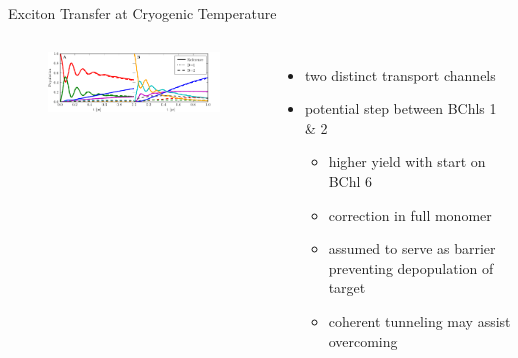 \documentclass{beamer}
\begin{document}
\begin{frame}[label=cryogenic2]{Exciton Transfer at Cryogenic Temperature}
\begin{center}
\begin{columns}
      \begin{figure}[t]
        \centering
        \includegraphics[width=250pt]{fmo_ishfl.pdf}
      \end{figure}
      \begin{itemize}
        \item two distinct transport channels
        \item potential step between BChls 1 \& 2
          \begin{itemize}
            \pause
            \item higher yield with start on BChl 6
            \item correction in full monomer
            \item assumed to serve as barrier preventing depopulation of target
            \item coherent tunneling may assist overcoming
          \end{itemize}
      \end{itemize}
    \end{columns}
  \end{center}
\end{frame}
\end{document}
